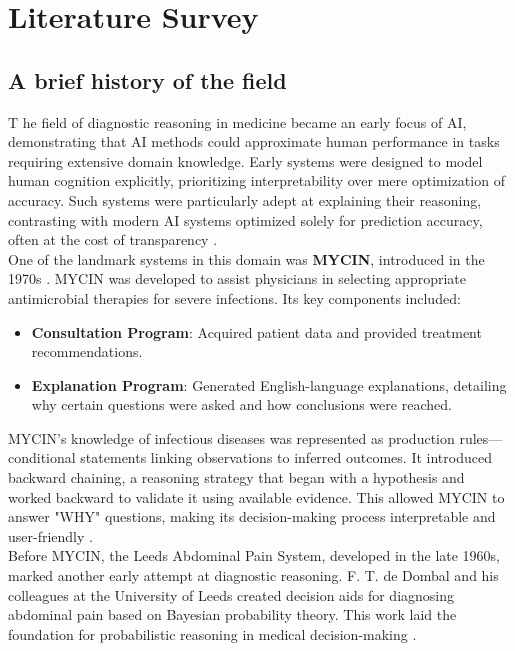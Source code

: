 \section{Literature Survey}
\subsection{A brief history of the field}
\lettrine{T}{ }he field of diagnostic reasoning in medicine became an early focus of AI, demonstrating that AI methods could approximate human performance in tasks requiring extensive domain knowledge. Early systems were designed to model human cognition explicitly, prioritizing interpretability over mere optimization of accuracy. Such systems were particularly adept at explaining their reasoning, contrasting with modern AI systems optimized solely for prediction accuracy, often at the cost of transparency \cite{cohen2022introducing}.\\[\baselineskip]

\noindent One of the landmark systems in this domain was \textcolor{TUMRed}{\textbf{MYCIN}}, introduced in the 1970s \cite{cohen2022intelligent, shortliffe2012computer, shortliffe1975model}. MYCIN was developed to assist physicians in selecting appropriate antimicrobial therapies for severe infections. Its key components included:
\begin{itemize}
    \item \textcolor{TUMRed}{\textbf{Consultation Program}}: Acquired patient data and provided treatment recommendations.
    \item \textcolor{TUMRed}{\textbf{Explanation Program}}: Generated English-language explanations, detailing why certain questions were asked and how conclusions were reached.
\end{itemize}

\noindent MYCIN's knowledge of infectious diseases was represented as production rules—conditional statements linking observations to inferred outcomes. It introduced backward chaining, a reasoning strategy that began with a hypothesis and worked backward to validate it using available evidence. This allowed MYCIN to answer "WHY" questions, making its decision-making process interpretable and user-friendly \cite{shortliffe1975model, musen2021clinical}.\\[\baselineskip]

\noindent Before MYCIN, the Leeds Abdominal Pain System, developed in the late 1960s, marked another early attempt at diagnostic reasoning. F. T. de Dombal and his colleagues at the University of Leeds created decision aids for diagnosing abdominal pain based on Bayesian probability theory. This work laid the foundation for probabilistic reasoning in medical decision-making \cite{musen2021clinical}.\\[\baselineskip]

